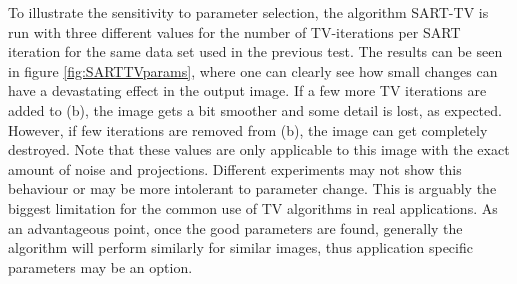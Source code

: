 \begin{table}
\begin{center}
\caption{NRMSE for the reconstructed images in figure \ref{fig:TVXCAT}}
\label{tab:NRMSE TVs}
\end{center}
\end{table}






To illustrate the sensitivity to parameter selection, the algorithm SART-TV is run with three different values for the number of TV-iterations per SART iteration for the same data set used in the previous test. The results can be seen in figure \ref{fig:SARTTVparams}, where one can clearly see how small changes can have a devastating effect in the output image.   If a few more TV iterations are added to (b), the image gets a bit smoother and some detail is lost, as expected. However, if few iterations are removed from (b), the image can get completely destroyed. Note that these values are only applicable to this image with the exact amount of noise and projections. Different experiments may not show this behaviour or may be more intolerant to parameter change. This is arguably the biggest limitation for the common use of TV algorithms in real applications. As an advantageous point, once the good parameters are found, generally the algorithm will perform similarly for similar images, thus application specific parameters may be an option.






